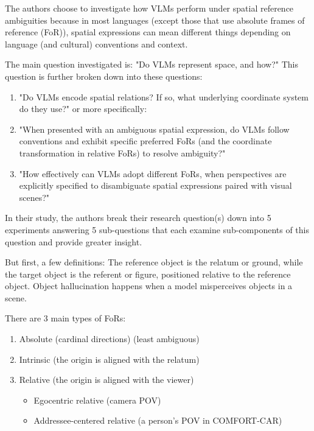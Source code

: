 \documentclass[12pt, letterpaper]{article}
\begin{document}
\begin{spacing}{1.10}
The authors choose to investigate how VLMs perform under spatial reference ambiguities because in most languages (except those that use absolute frames of reference (FoR)), spatial expressions can mean different things depending on language (and cultural) conventions and context.

\noindent The main question investigated is: "Do VLMs represent space, and how?" This question is further broken down into these questions:

\begin{enumerate}
    \item "Do VLMs encode spatial relations? If so, what underlying coordinate system do they use?" or more specifically:
    \item "When presented with an ambiguous spatial expression, do VLMs follow conventions and exhibit specific preferred FoRs (and the coordinate transformation in relative FoRs) to resolve ambiguity?"
    \item "How effectively can VLMs adopt different FoRs, when perspectives are explicitly specified to disambiguate spatial expressions paired with visual scenes?"
\end{enumerate}

In their study, the authors break their research question(s) down into 5 experiments answering 5 sub-questions that each examine sub-components of this question and provide greater insight.

But first, a few definitions: The reference object is the relatum or ground, while the target object is the referent or figure, positioned relative to the reference object. Object hallucination happens when a model misperceives objects in a scene.

\noindent There are 3 main types of FoRs:
\begin{enumerate}
    \item Absolute (cardinal directions) (least ambiguous)
    \item Intrinsic (the origin is aligned with the relatum)
    \item Relative (the origin is aligned with the viewer)
    \begin{itemize}
        \item Egocentric relative (camera POV)
        \item Addressee-centered relative (a person's POV in COMFORT-CAR)
    \end{itemize}
\end{enumerate}


\end{spacing}
\end{document}
